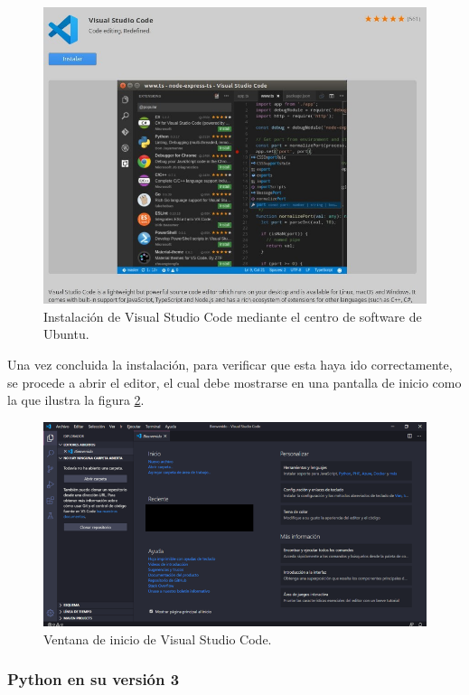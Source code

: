 {{\begin{figure}[H]
    \centering
    \includegraphics[scale=0.82]{Capitulo4/Documentos/imagenes_entorno/figura2-1-2.jpg}
    \caption{Instalación de Visual Studio Code mediante el centro de software de Ubuntu.}
    \label{2.1.2}
\end{figure}

\noindent Una vez concluida la instalación, para verificar que esta haya ido correctamente, se procede a abrir el editor, el cual debe mostrarse en una pantalla de inicio como la que ilustra la figura \ref{2.1.3}.

\begin{figure}[H]
    \centering
    \includegraphics[scale=0.82]{Capitulo4/Documentos/imagenes_entorno/figura2-1-3.png}
    \caption{Ventana de inicio de Visual Studio Code.}
    \label{2.1.3}
\end{figure}

\subsubsection{Python en su versión 3}

}}
